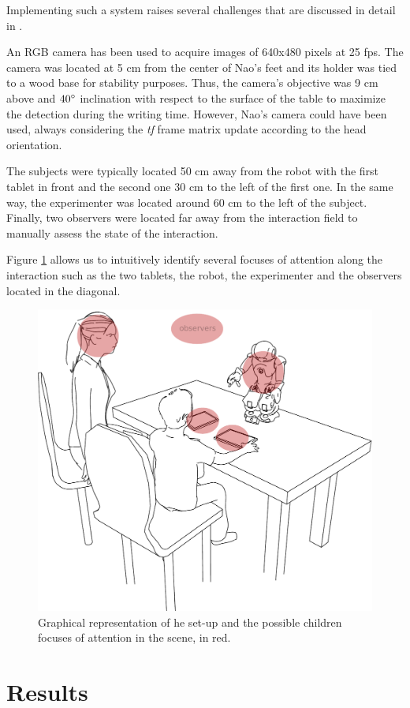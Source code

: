 \documentclass{sig-alternate}
\begin{document}
Implementing such a system raises several challenges that are discussed in detail in \cite{Hood:2015}.

An RGB camera has been used to acquire images of 640x480 pixels at 25 fps. The camera was located at 5 cm from the center of Nao's feet and its holder was tied to a wood base for stability purposes. Thus, the camera's objective was 9 cm above and $ 40\degree $ inclination with respect to the surface of the table to maximize the detection during the writing time. However, Nao's camera could have been used, always considering the \textit{tf} frame matrix update according to the head orientation.

The subjects were typically located 50 cm away from the robot with the first tablet in front and the second one 30 cm to the left of the first one. In the same way, the experimenter was located around 60 cm to the left of the subject. Finally, two observers were located far away from the interaction field to manually assess the state of the interaction.

Figure \ref{drawSetup} allows us to intuitively identify several focuses of attention along the interaction such as the two tablets, the robot, the experimenter and the observers located in the diagonal.

\begin{figure}[h!]
    \centering
    \includegraphics[width=0.7\columnwidth]{drawSetup}
    \caption{\small Graphical representation of he set-up and the possible children focuses of attention in the scene, in red.}
    \label{drawSetup}
\end{figure}


\section{Results}
\end{document}
